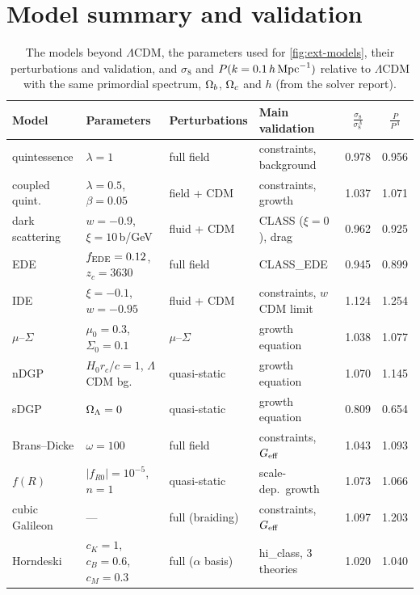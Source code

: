 \section{Model summary and validation}

\begin{table}[htbp]
\centering\small
\caption{The models beyond $\Lambda$CDM, the parameters used for \cref{fig:ext-models}, their perturbations and
validation, and $\sigma_8$ and $P(k=0.1\,h\,\mathrm{Mpc}^{-1})$ relative to $\Lambda$CDM with the same primordial spectrum,
$\Omega_b$, $\Omega_c$ and $h$ (from the solver report).}
\label{tab:ext-models}
\begin{tabularx}{\textwidth}{@{}llXlcc@{}}
\toprule
Model & Parameters & Perturbations & Main validation & $\frac{\sigma_8}{\sigma_8^{\Lambda}}$ & $\frac{P}{P^{\Lambda}}$ \\
\midrule
quintessence & $\lambda=1$ & full field & constraints, background & 0.978 & 0.956 \\
coupled quint. & $\lambda=0.5$, $\beta=0.05$ & field + CDM & constraints, growth & 1.037 & 1.071 \\
dark scattering & $w=-0.9$, $\xi=10$\,b/GeV & fluid + CDM & CLASS ($\xi=0$), drag & 0.962 & 0.925 \\
EDE & $f_{\rm EDE}=0.12$, $z_c=3630$ & full field & CLASS\_EDE & 0.945 & 0.899 \\
IDE & $\xi=-0.1$, $w=-0.95$ & fluid + CDM & constraints, $w$CDM limit & 1.124 & 1.254 \\
$\mu$--$\Sigma$ & $\mu_0=0.3$, $\Sigma_0=0.1$ & $\mu$--$\Sigma$ & growth equation & 1.038 & 1.077 \\
nDGP & $H_0r_c/c=1$, $\Lambda$CDM bg. & quasi-static & growth equation & 1.070 & 1.145 \\
sDGP & $\Omega_\Lambda=0$ & quasi-static & growth equation & 0.809 & 0.654 \\
Brans--Dicke & $\omega=100$ & full field & constraints, $G_{\rm eff}$ & 1.043 & 1.093 \\
$f(R)$ & $|f_{R0}|=10^{-5}$, $n=1$ & quasi-static & scale-dep.\ growth & 1.073 & 1.066 \\
cubic Galileon & --- & full (braiding) & constraints, $G_{\rm eff}$ & 1.097 & 1.203 \\
Horndeski & $c_K=1$, $c_B=0.6$, $c_M=0.3$ & full ($\alpha$ basis) & hi\_class, 3 theories & 1.020 & 1.040 \\
\bottomrule
\end{tabularx}
\end{table}

